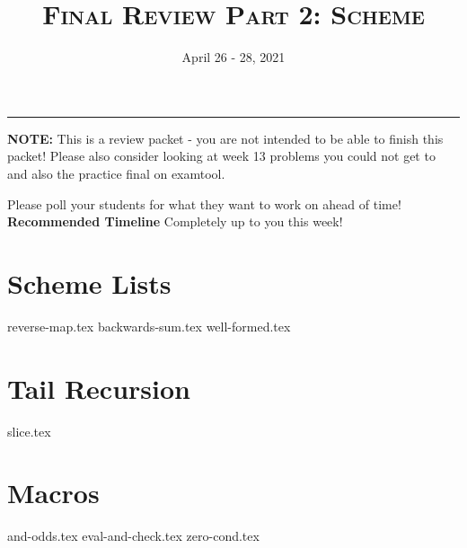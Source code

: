 \documentclass{exam}
\title{\textsc{Final Review Part 2: Scheme}}
\date{April 26 - 28, 2021}
\begin{document}
\maketitle\rule{\textwidth}{0.15em}
\fontsize{12}{15}\selectfont

\begin{blocksection}
\begin{guide}
\textbf{NOTE:} This is a review packet - you are not intended to be able to finish this packet! Please also consider looking at week 13 problems you could not get to and also the practice final on examtool.

Please poll your students for what they want to work on ahead of time!
\textbf{Recommended Timeline}
Completely up to you this week!
\end{guide}
\end{blocksection}

\section{Scheme Lists}
\begin{questions}
{reverse-map.tex}
{backwards-sum.tex}
{well-formed.tex}

\section{Tail Recursion}
{slice.tex}

\section{Macros}
{and-odds.tex}
{eval-and-check.tex}
{zero-cond.tex}

\end{questions}
\end{document}
